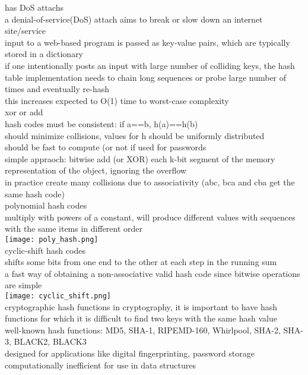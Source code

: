 \scriptsize{has DoS attachs}\\ {\tiny a denial-of-service(DoS) attach aims to break or slow down an internet site/service\\
input to a web-based program is passed as key-value pairs, which are typically stored in a dictionary\\
if one intentionally posts an input with large number of colliding keys, the hash table implementation needs to chain long sequences or probe large number of times and eventually re-hash\\
this increases expected to O(1) time to worst-case complexity
}\\
\scriptsize{xor or add}\\
{\tiny hash codes must be consistent: if a==b, h(a)==h(b)\\
should minimize collisions, values for h should be uniformly distributed\\
should be fast to compute (or not if used for passwords\\
simple appraoch: bitwise add (or XOR) each k-bit segment of the memory representation of the object, ignoring the overflow\\
in practice create many collisions due to associativity (abc, bca and cba get the same hash code)
}\\
\scriptsize{polynomial hash codes}\\
{\tiny multiply with powers of a constant, will produce different values with sequences with the same items in different order\\
\texttt{[image: poly\_hash.png]}
}\\
\scriptsize{cyclic-shift hash codes}\\
{\tiny shifts some bits from one end to the other at each step in the running sum\\
a fast way of obtaining a non-associative valid hash code since bitwise operations are simple \\
\texttt{[image: cyclic\_shift.png]}
}\\
\scriptsize{cryptographic hash functions} {\tiny in cryptography, it is important to have hash functions for which it is difficult to find two keys with the same hash value\\
well-known hash functions: MD5, SHA-1, RIPEMD-160, Whirlpool, SHA-2, SHA-3, BLACK2, BLACK3\\
designed for applications like digital fingerprinting, password storage\\
computationally inefficient for use in data structures
}